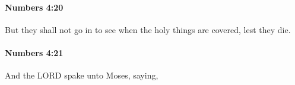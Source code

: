 		\paragraph{Numbers 4:20} %
			\label{NUMBERS-4-20}

			But they shall not go in to see when the holy things are covered, lest they die.


		\paragraph{Numbers 4:21} %
			\label{NUMBERS-4-21}

			And the LORD spake unto Moses, saying,


